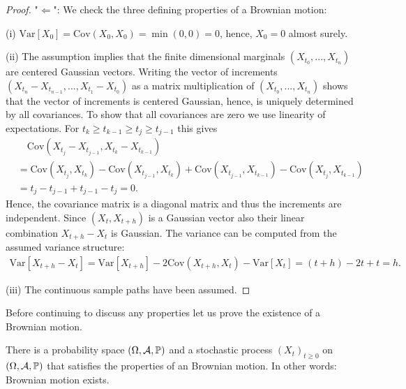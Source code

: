 \begin{proof}[Proof]
	"$\Leftarrow$"{}: We check the three defining properties of a Brownian motion:

	(i) $\text{Var}[X_0]=\text{Cov}(X_0,X_0)=\min(0,0)=0$, hence, $X_0=0$ almost surely.\smallskip
	
	(ii) The assumption implies that the finite dimensional marginals $(X_{t_0},...,X_{t_n})$ are centered Gaussian vectors. Writing the vector of increments $(X_{t_n}-X_{t_{n-1}},...,X_{t_1}-X_{t_0})$ as a matrix multiplication of $(X_{t_0},...,X_{t_n})$ shows that the vector of increments is centered Gaussian, hence, is uniquely determined by all  covariances. To show that all covariances are zero we use linearity of expectations. For $t_k\geq t_{k-1}\geq t_j\geq t_{j-1}$ this gives
	\begin{align*}
		&\quad \text{Cov}(X_{t_j}-X_{t_{j-1}}, X_{t_k}-X_{t_{k-1}})\\
		&=\text{Cov}(X_{t_j},X_{t_{k}}) -\text{Cov}(X_{t_{j-1}},X_{t_{k}})+\text{Cov}(X_{t_{j-1}},X_{t_{k-1}})-\text{Cov}(X_{t_{j}},X_{t_{k-1}})\\
		&=t_j-t_{j-1}+t_{j-1}-t_j=0.
	\end{align*}
	Hence, the covariance matrix is a diagonal matrix and thus the increments are independent. Since $(X_t,X_{t+h})$ is a Gaussian vector also their linear combination $X_{t+h}-X_{t}$ is Gaussian. The variance can be computed from the assumed variance structure:
	\begin{align*}
		\text{Var}[X_{t+h}-X_t]=\text{Var}[X_{t+h}]-2\text{Cov}(X_{t+h},X_t)-\text{Var}[X_t]=(t+h)-2t+t=h.
	\end{align*}

	(iii) The continuous sample paths have been assumed.
\end{proof}
Before continuing to discuss any properties let us prove the existence of a Brownian motion.  
\begin{lsuperwichtigersatzExistence}
\begin{theorem}\label{canonical_construction_BM}
	There is a probability space $(\Omega,\mathcal{A},\mathbb{P})$ and a stochastic process $(X_t)_{t\geq 0}$ on $(\Omega,\mathcal{A},\mathbb{P})$ that satisfies the properties of an Brownian motion. In other words: Brownian motion exists.
\end{theorem}
\end{lsuperwichtigersatzExistence}

